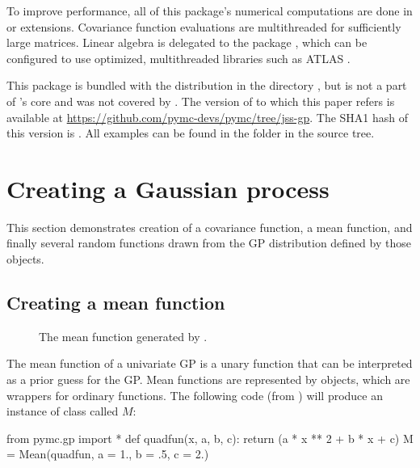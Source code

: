 \documentclass[article]{jss}
\begin{document}
To improve performance, all of this package's numerical computations are done in  or  extensions. Covariance function evaluations are multithreaded for sufficiently large matrices. Linear algebra is delegated to the  package \citep{numpybook}, which can be configured to use optimized, multithreaded libraries such as ATLAS \citep{atlas}. 

\medskip
This package is bundled with the  distribution in the directory , but is not a part of 's core and was not covered by \cite{pymc}. The version of  to which this paper refers is available at \href{https://github.com/pymc-devs/pymc/tree/jss-gp}{https://github.com/pymc-devs/pymc/tree/jss-gp}. The SHA1 hash of this version is . All examples can be found in the folder  in the source tree.

\section{Creating a Gaussian process}\label{sub:inst}


This section demonstrates creation of a covariance function, a mean function, and finally several random functions drawn from the GP distribution defined by those objects.

\subsection{Creating a mean function}\label{subsub:mean}

\begin{figure}
    \centering
    \caption{The mean function generated by .}
    \label{fig:mean}
\end{figure}

The mean function of a univariate GP is a unary function that can be interpreted as a prior guess for the GP. Mean functions are represented by  objects, which are wrappers for ordinary  functions. The following code (from ) will produce an instance of class  called $M$:
\begin{CodeChunk}
\begin{CodeInput}
from pymc.gp import *
def quadfun(x, a, b, c):
    return (a * x ** 2 + b * x + c)
M = Mean(quadfun, a = 1., b = .5, c = 2.)        
\end{CodeInput}
\end{CodeChunk}
\end{document}
